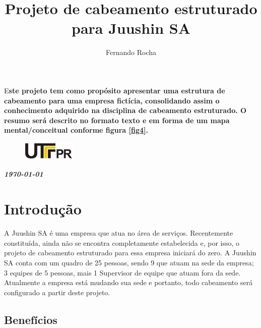 \documentclass[	DIV=calc,%
paper=a4,%
fontsize=12pt,%
onecolumn]{scrartcl}	 					%
\title{Projeto de cabeamento estruturado para Juushin SA}
\author{Fernando Rocha }  	%
\date{}																				%
\newcommand{\initial}[1]{%
	\lettrine[lines=3,lhang=0.3,nindent=0em]{
		\color{DarkGoldenrod}
		{\textsf{#1}}}{}}
\begin{document}
	\maketitle
	\thispagestyle{fancy} 	
	\thispagestyle{empty}		%
	
	\initial{E}\textbf{ste projeto tem como propósito apresentar uma estrutura de cabeamento para uma empresa fictícia, consolidando assim o conhecimento adquirido na disciplina de cabeamento estruturado.
		O resumo será descrito no formato texto e em forma de um mapa mental/conceitual conforme figura \ref{fig4}.}
	
	
	\begin{figure}
		\centering
		\includegraphics{utfpr}
	\end{figure}
	
	\vspace{2cm}
	\centerline{\textit{\textbf{\today}}}
	
	\clearpage
	\renewcommand*\listfigurename{Lista de figuras}
	\listoffigures
	
	\renewcommand*\listtablename{Lista de tabelas}
	\listoftables
	
	
	
	
	\clearpage
	\renewcommand{\contentsname}{Sumário}
	\tableofcontents
	\clearpage
	
	
	\section{Introdução}
	A Juushin SA é uma empresa que atua no área de serviços. Recentemente constituída, ainda não se encontra completamente estabelecida e, por isso, o projeto de cabeamento estruturado para essa empresa iniciará do zero. A Juushin SA conta com um quadro de 25 pessoas, sendo 9 que atuam na sede da empresa; 3 equipes de 5 pessoas, mais 1 Supervisor de equipe que atuam fora da sede. Atualmente a empresa está mudando sua sede e portanto, todo cabeamento será configurado a partir deste projeto.
	
	\subsection{Benefícios}
	
\end{document}
